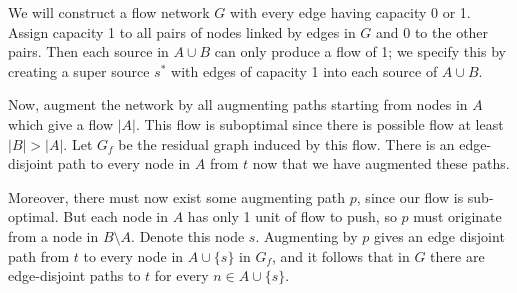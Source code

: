 \documentclass{article}
\newcommand{\problem}[1]{\noindent {\bf #1}}
\begin{document}
\problem{Problem 2.}

We will construct a flow network $G$ with every edge having capacity 0 or 1. Assign capacity 1 to all pairs of nodes linked by edges in $G$ and 0 to the other pairs. Then each source in $A\cup B$ can only produce a flow of 1; we specify this by creating a super source $s^{\ast}$ with edges of capacity 1 into each source of $A\cup B$.

Now, augment the network by all augmenting paths starting from nodes in $A$ which give a flow $|A|$. This flow is suboptimal since there is possible flow at least $|B|>|A|$. Let $G_f$ be the residual graph induced by this flow. There is an edge-disjoint path to every node in $A$ from $t$ now that we have augmented these paths.

Moreover, there must now exist some augmenting path $p$, since our flow is sub-optimal. But each node in $A$ has only 1 unit of flow to push, so $p$ must originate from a node in $B\setminus A$. Denote this node $s$. Augmenting by $p$ gives an edge disjoint path from $t$ to every node in $A\cup\{s\}$ in $G_f$, and it follows that in $G$ there are edge-disjoint paths to $t$ for every $n\in A\cup\{s\}$.

\problem{Problem 3.}
\end{document}

